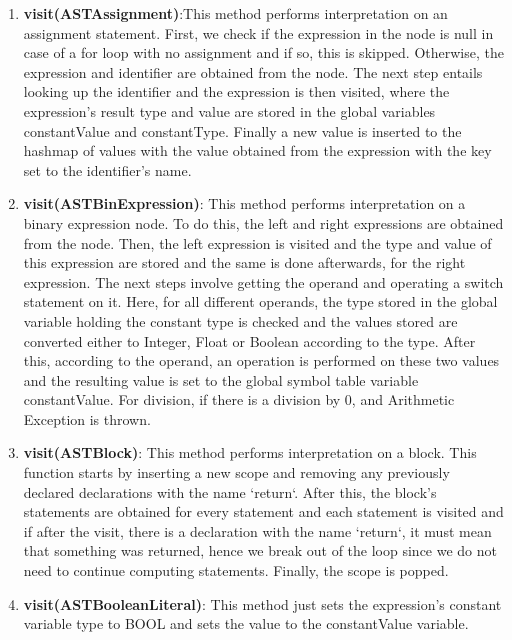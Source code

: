 \documentclass{article}
\begin{document}
			\begin{enumerate}

					\item \textbf{visit(ASTAssignment)}:This method performs interpretation on an assignment statement. First, we check if the expression in the node is null in case of a for loop with no assignment and if so, this is skipped. Otherwise, the expression and identifier are obtained from the node. The next step entails looking up the identifier and the expression is then visited, where the expression's result type and value are stored in the global variables constantValue and constantType.  Finally a new value is inserted to the hashmap of values with the value obtained from the expression with the key set to the identifier's name.
			
					\item \textbf{visit(ASTBinExpression)}: This method performs interpretation on a binary expression node. To do this, the left and right expressions are obtained from the node. Then, the left expression is visited and the type and value of this expression are stored and the same is done afterwards,  for the right expression. The next steps involve getting the operand and operating a switch statement on it. Here, for all different operands, the type stored in the global variable holding the constant type is checked and the values stored are converted either to Integer, Float or Boolean according to the type. After this, according to the operand, an operation is performed on these two values and the resulting value is set to the global symbol table variable constantValue. For division, if there is a division by 0, and Arithmetic Exception is thrown.
			
					\item \textbf{visit(ASTBlock)}: This method performs interpretation on a block. This function starts by inserting a new scope and removing any previously declared declarations with the name `return`. After this, the block's statements are obtained for every statement and each statement is visited and if after the visit, there is a declaration with the name `return`, it must mean that something was returned, hence we break out of the loop since we do not need to continue computing statements. Finally, the scope is popped.
			
					\item \textbf{visit(ASTBooleanLiteral)}: This method just sets the expression's constant variable type to BOOL and sets the value to the constantValue variable.
	

\end{enumerate}
\end{document}
